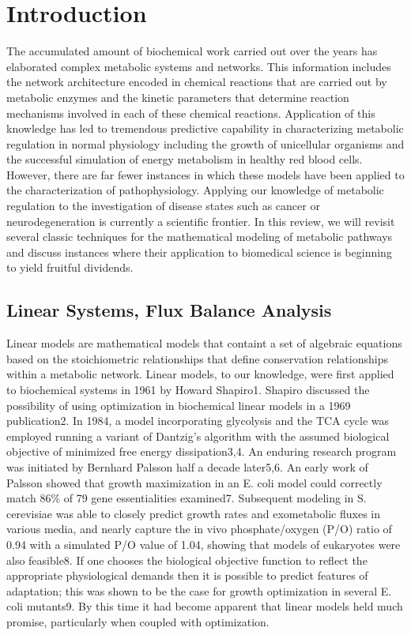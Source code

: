 \documentclass[phd,tocprelim]{cornell}
\begin{document}
\contentspage
\tablelistpage
\figurelistpage

\normalspacing \setcounter{page}{1} 
\pagestyle{cornell} \addtolength{\parskip}{0.5\baselineskip}

\chapter{Introduction}

The accumulated amount of biochemical work carried out over the years
has elaborated complex metabolic systems and networks.  This
information includes the network architecture encoded in chemical
reactions that are carried out by metabolic enzymes and the kinetic
parameters that determine reaction mechanisms involved in each of
these chemical reactions.  Application of this knowledge has led to
tremendous predictive capability in characterizing metabolic
regulation in normal physiology including the growth of unicellular
organisms and the successful simulation of energy metabolism in
healthy red blood cells.  However, there are far fewer instances in
which these models have been applied to the characterization of
pathophysiology.  Applying our knowledge of metabolic regulation to
the investigation of disease states such as cancer or
neurodegeneration is currently a scientific frontier.  In this review,
we will revisit several classic techniques for the mathematical
modeling of metabolic pathways and discuss instances where their
application to biomedical science is beginning to yield fruitful
dividends.

\section{Linear Systems, Flux Balance Analysis}
Linear models are mathematical models that containt a set of algebraic
equations based on the stoichiometric relationships that define
conservation relationships within a metabolic network.  Linear models,
to our knowledge, were first applied to biochemical systems in 1961 by
Howard Shapiro1. Shapiro discussed the possibility of using
optimization in biochemical linear models in a 1969 publication2. In
1984, a model incorporating glycolysis and the TCA cycle was employed
running a variant of Dantzig’s algorithm with the assumed biological
objective of minimized free energy dissipation3,4. An enduring
research program was initiated by Bernhard Palsson half a decade
later5,6.  An early work of Palsson showed that growth maximization in
an E. coli model could correctly match 86\% of 79 gene essentialities
examined7. Subsequent modeling in S. cerevisiae was able to closely
predict growth rates and exometabolic fluxes in various media, and
nearly capture the in vivo phosphate/oxygen (P/O) ratio of 0.94 with a
simulated P/O value of 1.04, showing that models of eukaryotes were
also feasible8. If one chooses the biological objective function to
reflect the appropriate physiological demands then it is possible to
predict features of adaptation; this was shown to be the case for
growth optimization in several E. coli mutants9. By this time it had
become apparent that linear models held much promise, particularly
when coupled with optimization.
\end{document}
